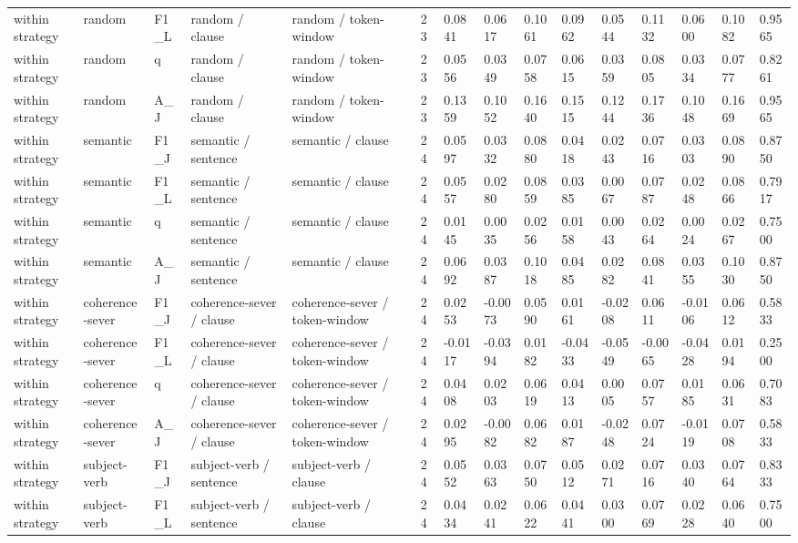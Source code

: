 \begin{table}[t]
{\begin{tabular}{lllllllllllllll}
within strategy & random & F1\_L & random / clause & random / token-window & 23 & 0.0841 & 0.0617 & 0.1061 & 0.0962 & 0.0544 & 0.1132 & 0.0600 & 0.1082 & 0.9565 \\
within strategy & random & q & random / clause & random / token-window & 23 & 0.0556 & 0.0349 & 0.0758 & 0.0615 & 0.0359 & 0.0805 & 0.0334 & 0.0777 & 0.8261 \\
within strategy & random & A\_J & random / clause & random / token-window & 23 & 0.1359 & 0.1052 & 0.1640 & 0.1515 & 0.1244 & 0.1736 & 0.1048 & 0.1669 & 0.9565 \\
within strategy & semantic & F1\_J & semantic / sentence & semantic / clause & 24 & 0.0597 & 0.0332 & 0.0880 & 0.0418 & 0.0243 & 0.0716 & 0.0303 & 0.0890 & 0.8750 \\
within strategy & semantic & F1\_L & semantic / sentence & semantic / clause & 24 & 0.0557 & 0.0280 & 0.0859 & 0.0385 & 0.0067 & 0.0787 & 0.0248 & 0.0866 & 0.7917 \\
within strategy & semantic & q & semantic / sentence & semantic / clause & 24 & 0.0145 & 0.0035 & 0.0256 & 0.0158 & 0.0043 & 0.0264 & 0.0024 & 0.0267 & 0.7500 \\
within strategy & semantic & A\_J & semantic / sentence & semantic / clause & 24 & 0.0692 & 0.0387 & 0.1018 & 0.0485 & 0.0282 & 0.0841 & 0.0355 & 0.1030 & 0.8750 \\
within strategy & coherence-sever & F1\_J & coherence-sever / clause & coherence-sever / token-window & 24 & 0.0253 & -0.0073 & 0.0590 & 0.0161 & -0.0208 & 0.0611 & -0.0106 & 0.0612 & 0.5833 \\
within strategy & coherence-sever & F1\_L & coherence-sever / clause & coherence-sever / token-window & 24 & -0.0117 & -0.0394 & 0.0182 & -0.0433 & -0.0549 & -0.0065 & -0.0428 & 0.0194 & 0.2500 \\
within strategy & coherence-sever & q & coherence-sever / clause & coherence-sever / token-window & 24 & 0.0408 & 0.0203 & 0.0619 & 0.0413 & 0.0005 & 0.0757 & 0.0185 & 0.0631 & 0.7083 \\
within strategy & coherence-sever & A\_J & coherence-sever / clause & coherence-sever / token-window & 24 & 0.0295 & -0.0082 & 0.0682 & 0.0187 & -0.0248 & 0.0724 & -0.0119 & 0.0708 & 0.5833 \\
within strategy & subject-verb & F1\_J & subject-verb / sentence & subject-verb / clause & 24 & 0.0552 & 0.0363 & 0.0750 & 0.0512 & 0.0271 & 0.0716 & 0.0340 & 0.0764 & 0.8333 \\
within strategy & subject-verb & F1\_L & subject-verb / sentence & subject-verb / clause & 24 & 0.0434 & 0.0241 & 0.0622 & 0.0441 & 0.0300 & 0.0769 & 0.0228 & 0.0640 & 0.7500 \\

\end{tabular}}
\end{table}
